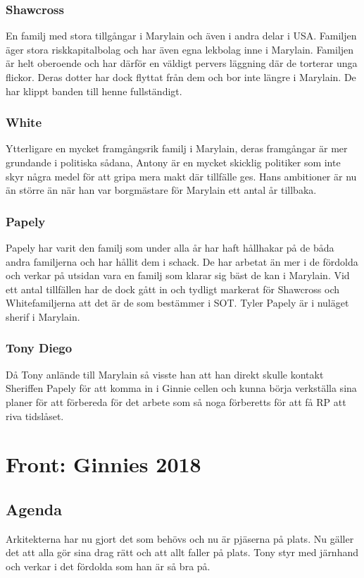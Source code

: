 \documentclass[a5paper,10pt]{report}
\begin{document}
\subsubsection{Shawcross}
En familj med stora tillgångar i Marylain och även i andra delar i USA. Familjen äger stora riskkapitalbolag och har även egna lekbolag inne i Marylain. Familjen är helt oberoende och har därför en väldigt pervers läggning där de torterar unga flickor. Deras dotter har dock flyttat från dem och bor inte längre i Marylain. De har klippt banden till henne fullständigt.
\subsubsection{White}
Ytterligare en mycket framgångsrik familj i Marylain, deras framgångar är mer grundande i politiska sådana, Antony är en mycket skicklig politiker som inte skyr några medel för att gripa mera makt där tillfälle ges. Hans ambitioner är nu än större än när han var borgmästare för Marylain ett antal år tillbaka.
\subsubsection{Papely}
Papely har varit den familj som under alla år har haft hållhakar på de båda andra familjerna och har hållit dem i schack. De har arbetat än mer i de fördolda och verkar på utsidan vara en familj som klarar sig bäst de kan i Marylain. Vid ett antal tillfällen har de dock gått in och tydligt markerat för Shawcross och Whitefamiljerna att det är de som bestämmer i SOT. Tyler Papely är i nuläget sherif i Marylain.
\subsubsection{Tony Diego}
Då Tony anlände till Marylain så visste han att han direkt skulle kontakt Sheriffen Papely för att komma in i Ginnie cellen och kunna börja verkställa sina planer för att förbereda för det arbete som så noga förberetts för att få RP att riva tidslåset.
\section{Front: Ginnies 2018}
\subsection{Agenda}
Arkitekterna har nu gjort det som behövs och nu är pjäserna på plats. Nu gäller det att alla gör sina drag rätt och att allt faller på plats. Tony styr med järnhand och verkar i det fördolda som han är så bra på.
\end{document}
